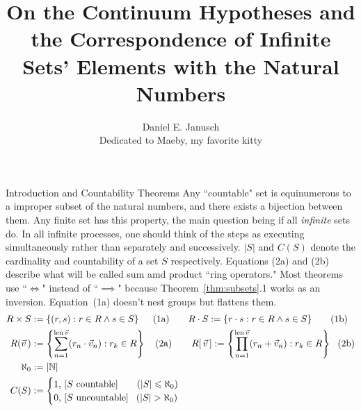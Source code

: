 \documentclass[12pt]{article}
\begin{document}
\title{On the Continuum Hypotheses and the Correspondence of Infinite Sets' Elements with the Natural Numbers}
\author{Daniel E. Janusch\\Dedicated to Maeby, my favorite kitty}
\maketitle

\begin{section}{Introduction and Countability Theorems}\label{sec:background}
	Any ``countable" set is equinumerous to a improper subset of the natural numbers, and
	there exists a bijection between them. Any finite set has this property, the main
	question being if all \emph{infinite} sets do. In all infinite processes, one should
	think of the steps as executing simultaneously rather than separately and successively.
	$|S|$ and $C(S)$ denote the cardinality and countability of a set $S$ respectively.
	Equations (2a) and (2b) describe what will be called sum amd product ``ring operators."
	Most theorems use ``$\iff$" instead of ``$\implies$" because Theorem~\ref{thm:subsets}.1
	works as an inversion. Equation~(1a) doesn't nest groups but flattens them.
	\vspace{-1em}\\
	\begin{align}
		R\times S & :=\left\{(r,s):r\in R\land s\in S\right\}~~~~(1\text a)
		\hspace{2em}
		R\cdot S:=\left\{r\cdot s:r\in R\land s\in S\right\}~~~~~\,(1\text b)\\
		R(\vec v\,) & :=\left\{\sum_{n=1}^{\text{len}\,\vec v}(r_n\cdot\vec v_n):r_k\in R\right\}~~~(2\text a)
		\hspace{2.1em}
		R[\,\vec v\,]:=\left\{\prod_{n=1}^{\text{len}\,\vec v}(r_n+\vec v_n):r_k\in R\right\}~~(2\text b)\\
		\aleph_0 & := |\mathbb N|\\
		C(S) & :=\begin{cases}
			1,\,\left[S\text{ countable}\right]\phantom{un}~~(|S|\leqslant\aleph_0)\\
			0,\,\left[S\text{ uncountable}\right]~~(|S|>\aleph_0)\\
		\end{cases}
	\end{align}


\end{section}
\end{document}
